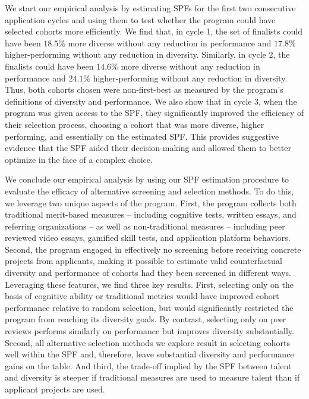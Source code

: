 We start our empirical analysis by estimating SPFs for the first two consecutive application cycles and using them to test whether the program could have selected cohorts more efficiently. We find that, in cycle 1, the set of finalists could have been $18.5\%$ more diverse without any reduction in performance and $17.8\%$ higher-performing without any reduction in diversity. Similarly, in cycle 2, the finalists could have been $14.6\%$ more diverse without any reduction in performance and $24.1\%$ higher-performing without any reduction in diversity. Thus, both cohorts chosen were non-first-best as measured by the program's definitions of diversity and performance. We also show that in cycle 3, when the program was given access to the SPF, they significantly improved the efficiency of their selection process, choosing a cohort that was more diverse, higher performing, and essentially on the estimated SPF. This provides suggestive evidence that the SPF aided their decision-making and allowed them to better optimize in the face of a complex choice.

We conclude our empirical analysis by using our SPF estimation procedure to evaluate the efficacy of alternative screening and selection methods. To do this, we leverage two unique aspects of the program. First, the program collects both traditional merit-based measures -- including cognitive tests, written essays, and referring organizations -- as well as non-traditional measures -- including peer reviewed video essays, gamified skill tests, and application platform behaviors. Second, the program engaged in effectively no screening before receiving concrete projects from applicants, making it possible to estimate valid counterfactual diversity and performance of cohorts had they been screened in different ways. Leveraging these features, we find three key results. First, selecting only on the basis of cognitive ability or traditional metrics would have improved cohort performance relative to random selection, but would significantly restricted the program from reaching its diversity goals. By contrast, selecting only on peer reviews performs similarly on performance but improves diversity substantially. Second, all alternative selection methods we explore result in selecting cohorts well within the SPF and, therefore, leave substantial diversity and performance gains on the table. And third, the trade-off implied by the SPF between talent and diversity is steeper if traditional measures are used to measure talent than if applicant projects are used. 

